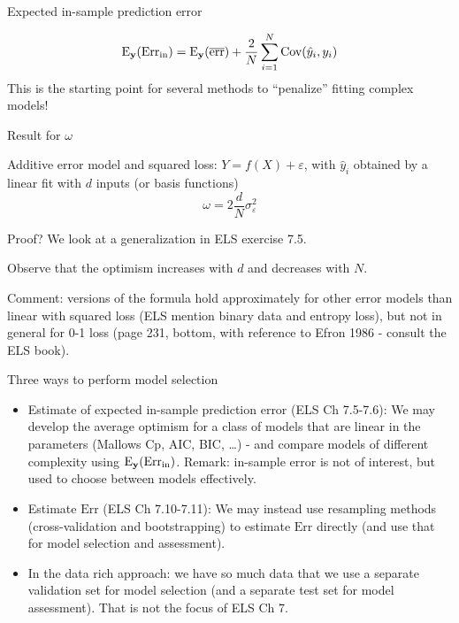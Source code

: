 \documentclass[
  ignorenonframetext,
]{beamer}
\begin{document}
\begin{frame}

\begin{block}{Expected in-sample prediction error}

\[ \text{E}_{\bf y}(\text{Err}_{\text{in}})=\text{E}_{\bf y}(\overline{\text{err}})+\frac{2}{N} \sum_{i=1}^N \text{Cov}(\hat{y}_i,y_i)\]
This is the starting point for several methods to ``penalize'' fitting
complex models!

\end{block}

\end{frame}

\begin{frame}

\begin{block}{Result for \(\omega\)}

Additive error model and squared loss: \(Y=f(X)+\varepsilon\), with
\(\hat{y}_i\) obtained by a linear fit with \(d\) inputs (or basis
functions) \[\omega=2 \frac{d}{N}\sigma_{\varepsilon}^2\]

Proof? We look at a generalization in ELS exercise 7.5.

Observe that the optimism increases with \(d\) and decreases with \(N\).

Comment: versions of the formula hold approximately for other error
models than linear with squared loss (ELS mention binary data and
entropy loss), but not in general for 0-1 loss (page 231, bottom, with
reference to Efron 1986 - consult the ELS book).

\end{block}

\end{frame}

\begin{frame}

\begin{block}{Three ways to perform model selection}

\begin{itemize}
\item
  Estimate of expected in-sample prediction error (ELS Ch 7.5-7.6): We
  may develop the average optimism for a class of models that are linear
  in the parameters (Mallows Cp, AIC, BIC, \ldots) - and compare models
  of different complexity using
  \(\text{E}_{\bf y}(\text{Err}_{\text{in}})\). Remark: in-sample error
  is not of interest, but used to choose between models effectively.
\item
  Estimate \(\text{Err}\) (ELS Ch 7.10-7.11): We may instead use
  resampling methods (cross-validation and bootstrapping) to estimate
  \(\text{Err}\) directly (and use that for model selection and
  assessment).
\item
  In the data rich approach: we have so much data that we use a separate
  validation set for model selection (and a separate test set for model
  assessment). That is not the focus of ELS Ch 7.
\end{itemize}

\end{block}

\end{frame}
\end{document}
